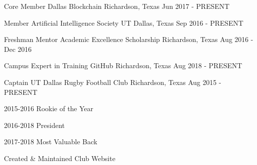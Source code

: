 

\begin{cventries}

  \cventry
    {Core Member} %
    {Dallas Blockchain} %
    {Richardson, Texas} %
    {Jun 2017 - PRESENT} %
    {
      \begin{cvitems} %
      \end{cvitems}
    }

  \cventry
    {Member} %
    {Artificial Intelligence Society} %
    {UT Dallas, Texas} %
    {Sep 2016 - PRESENT} %
    {
      \begin{cvitems} %
      \end{cvitems}
    }

  \cventry
    {Freshman Mentor} %
    {Academic Excellence Scholarship} %
    {Richardson, Texas} %
    {Aug 2016 - Dec 2016} %
    {
      \begin{cvitems} %
      \end{cvitems}
    }

  \cventry
    {Campus Expert in Training} %
    {GitHub} %
    {Richardson, Texas} %
    {Aug 2018 - PRESENT} %
    {
      \begin{cvitems} %
      \end{cvitems}
    }

  \cventry
    {Captain} %
    {UT Dallas Rugby Football Club} %
    {Richardson, Texas} %
    {Aug 2015 - PRESENT} %
    {
      \begin{cvitems} %
        \item {2015-2016 Rookie of the Year}
        \item {2016-2018 President}
        \item {2017-2018 Most Valuable Back}
        \item {Created \& Maintained Club Website}
      \end{cvitems}
    }

\end{cventries}
